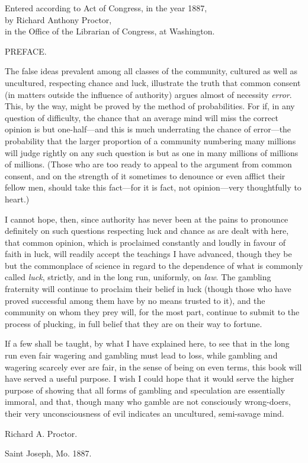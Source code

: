 \documentclass[letterpaper,12pt,oneside,openany]{memoir}
\begin{document}
\begin{center}
\vspace*{7.0in}
Entered according to Act of Congress, in the year 1887,\\
by Richard Anthony Proctor,\\
in the Office of the Librarian of Congress, at Washington.\\
\end{center}
\clearpage

\begin{center}{\LARGE PREFACE.}\end{center}
\bigskip
The false ideas prevalent among all classes of the
community, cultured as well as uncultured, respecting
chance and luck, illustrate the truth that common
consent (in matters outside the influence of authority)
argues almost of necessity \textit{error}. This, by the way,
might be proved by the method of probabilities. For
if, in any question of difficulty, the chance that an
average mind will miss the correct opinion is but
one-half---and this is much underrating the chance of error---the
probability that the larger proportion of a community
numbering many millions will judge rightly on
any such question is but as one in many millions of
millions of millions. (Those who are too ready to
appeal to the argument from common consent, and on
the strength of it sometimes to denounce or even afflict
their fellow men, should take this fact---for it is fact,
not opinion---very thoughtfully to heart.)

I cannot hope, then, since authority has never been
at the pains to pronounce definitely on such questions
respecting luck and chance as are dealt with here, that
common opinion, which is proclaimed constantly and
loudly in favour of faith in luck, will readily accept the
teachings I have advanced, though they be but the
commonplace of science in regard to the dependence
of what is commonly called \textit{luck}, strictly, and in the
long run, uniformly, on \textit{law}. The gambling fraternity
will continue to proclaim their belief in luck (though
those who have proved successful among them have by
no means trusted to it), and the community on whom
they prey will, for the most part, continue to submit to
the process of plucking, in full belief that they are on
their way to fortune.

If a few shall be taught, by what I have explained
here, to see that in the long run even fair wagering and
gambling must lead to loss, while gambling and wagering
scarcely ever are fair, in the sense of being on even
terms, this book will have served a useful purpose. I
wish I could hope that it would serve the higher purpose
of showing that all forms of gambling and speculation
are essentially immoral, and that, though many
who gamble are not consciously wrong-doers, their very
unconsciousness of evil indicates an uncultured, semi-savage
mind.\\
\medskip
\begin{scshape}
\begin{flushright}
Richard A. Proctor.\\
\end{flushright}
\end{scshape}
Saint Joseph, Mo. 1887.
\clearpage
\end{document}
